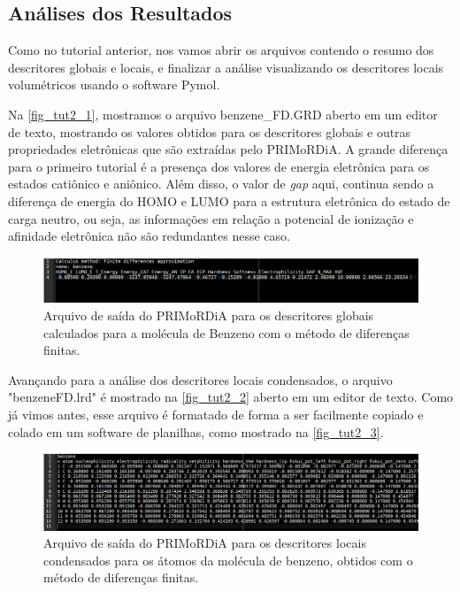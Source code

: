 \documentclass[a4paper,11pt]{refart}
\begin{document}
\subsection{Análises dos Resultados}

Como no tutorial anterior, nos vamos abrir os arquivos contendo o resumo dos descritores globais e locais, e finalizar a análise visualizando os descritores locais volumétricos usando o software Pymol. 

Na \autoref{fig_tut2_1}, mostramos o arquivo benzene\_FD.GRD aberto em um editor de texto, mostrando os valores obtidos para os descritores globais e outras propriedades eletrônicas que são extraídas pelo PRIMoRDiA. A grande diferença para o primeiro tutorial é a presença dos valores de energia eletrônica para os estados catiônico e aniônico. Além disso, o valor de \emph{gap} aqui, continua sendo a diferença de energia do HOMO e LUMO para a estrutura eletrônica do estado de carga neutro, ou seja, as informações em relação a potencial de ionização e afinidade eletrônica não são redundantes nesse caso.  

\hspace*{-\leftmarginwidth}
\begin{minipage}{\fullwidth}
	\begin{figure}[H]
		\begin{center}
			\includegraphics[width=7in]{images/tut2_img2}
			\caption{Arquivo de saída do PRIMoRDiA para os descritores globais calculados para a molécula de Benzeno com o método de diferenças finitas.}
			\label{fig_tut2_1}
		\end{center}
	\end{figure}
\end{minipage}

Avançando para a análise dos descritores locais condensados, o arquivo "benzeneFD.lrd" é mostrado na \autoref{fig_tut2_2} aberto em um editor de texto. Como já vimos antes, esse arquivo é formatado de forma a ser facilmente copiado e colado em um software de planilhas, como mostrado na \autoref{fig_tut2_3}.

\hspace*{-\leftmarginwidth}
\begin{minipage}{\fullwidth}
	\begin{figure}[H]
		\begin{center}
			\includegraphics[width=7in]{images/tut2_img3}
			\caption{Arquivo de saída do PRIMoRDiA para os descritores locais condensados para os átomos da molécula de benzeno, obtidos com o método de diferenças finitas.}
			\label{fig_tut2_2}
		\end{center}
	\end{figure}
\end{minipage}
\end{document}
